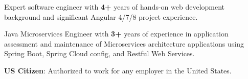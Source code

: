 \begin{cventries}
  \cventry
    {}
    {}
    {}
    {}
    {
      \vspace{-7mm}\begin{cvitems}
\item {Expert software engineer with \textbf{4+} years of hands-on web development background and significant Angular 4/7/8 project experience.}\vspace{1mm}\item {Java Microservices Engineer with \textbf{3+} years of experience in application assessment and maintenance of Microservices architecture applications using Spring Boot, Spring Cloud config, and Restful Web Services. }\vspace{1mm} 
\item { \textbf{US Citizen}: Authorized to work for any employer in the United States.}\vspace{1mm}
\end{cvitems}
    }
\end{cventries}
